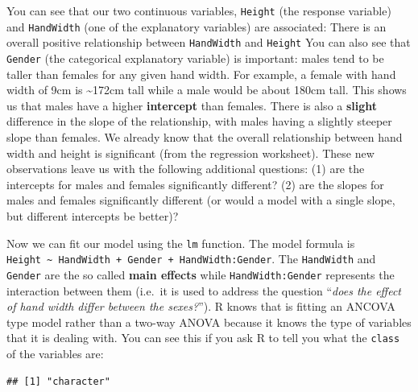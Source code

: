 \documentclass[
  a4paperpaper,
]{book}
\newenvironment{Shaded}{\begin{snugshade}}{\end{snugshade}}
\newcommand{\KeywordTok}[1]{\textcolor[rgb]{0.13,0.29,0.53}{\textbf{#1}}}
\newcommand{\NormalTok}[1]{#1}
\newcommand{\OperatorTok}[1]{\textcolor[rgb]{0.81,0.36,0.00}{\textbf{#1}}}
\begin{document}
You can see that our two continuous variables, \texttt{Height} (the response variable) and \texttt{HandWidth} (one of the explanatory variables) are associated: There is an overall positive relationship between \texttt{HandWidth} and \texttt{Height} You can also see that \texttt{Gender} (the categorical explanatory variable) is important: males tend to be taller than females for any given hand width. For example, a female with hand width of 9cm is \textasciitilde172cm tall while a male would be about 180cm tall. This shows us that males have a higher \textbf{intercept} than females. There is also a \textbf{slight} difference in the slope of the relationship, with males having a slightly steeper slope than females. We already know that the overall relationship between hand width and height is significant (from the regression worksheet). These new observations leave us with the following additional questions: (1) are the intercepts for males and females significantly different? (2) are the slopes for males and females significantly different (or would a model with a single slope, but different intercepts be better)?

Now we can fit our model using the \texttt{lm} function. The model formula is \texttt{Height\ \textasciitilde{}\ HandWidth\ +\ Gender\ +\ HandWidth:Gender}. The \texttt{HandWidth} and \texttt{Gender} are the so called \textbf{main effects} while \texttt{HandWidth:Gender} represents the interaction between them (i.e.~it is used to address the question ``\emph{does the effect of hand width differ between the sexes?}''). R knows that is fitting an ANCOVA type model rather than a two-way ANOVA because it knows the type of variables that it is dealing with. You can see this if you ask R to tell you what the \texttt{class} of the variables are:

\begin{Shaded}
\end{Shaded}

\begin{verbatim}
## [1] "character"
\end{verbatim}

\begin{Shaded}
\end{Shaded}
\end{document}
